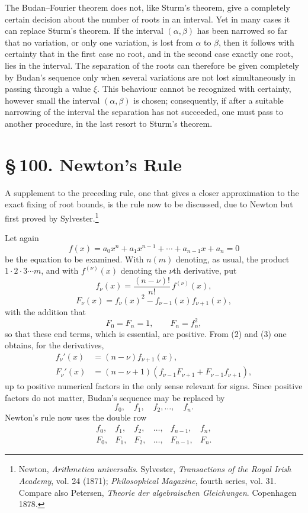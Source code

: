 \documentclass[11pt]{article}
\providecommand{\sect}[2]{\section*{\S\,#1. #2}}
\begin{document}
The Budan--Fourier theorem does not, like Sturm's theorem, give a completely certain decision about the number of roots in an interval. Yet in many cases it can replace Sturm's theorem. If the interval $(\alpha,\beta)$ has been narrowed so far that no variation, or only one variation, is lost from $\alpha$ to $\beta$, then it follows with certainty that in the first case no root, and in the second case exactly one root, lies in the interval. The separation of the roots can therefore be given completely by Budan's sequence only when several variations are not lost simultaneously in passing through a value $\xi$. This behaviour cannot be recognized with certainty, however small the interval $(\alpha,\beta)$ is chosen; consequently, if after a suitable narrowing of the interval the separation has not succeeded, one must pass to another procedure, in the last resort to Sturm's theorem.

\sect{100}{Newton's Rule}

A supplement to the preceding rule, one that gives a closer approximation to the exact fixing of root bounds, is the rule now to be discussed, due to Newton but first proved by Sylvester.\footnote{Newton, \emph{Arithmetica universalis}. Sylvester, \emph{Transactions of the Royal Irish Academy}, vol. 24 (1871); \emph{Philosophical Magazine}, fourth series, vol. 31. Compare also Petersen, \emph{Theorie der algebraischen Gleichungen}. Copenhagen 1878.}

Let again
\begin{equation}
        f(x)=a_0x^n+a_1x^{n-1}+\cdots+a_{n-1}x+a_n=0
\tag{1}
\end{equation}
be the equation to be examined. With $n(m)$ denoting, as usual, the product $1\cdot2\cdot3\cdots m$, and with $f^{(\nu)}(x)$ denoting the $\nu$th derivative, put
\begin{equation}
        f_\nu(x)=\frac{(n-\nu)!}{n!}\,f^{(\nu)}(x),
\tag{2}
\end{equation}
\begin{equation}
        F_\nu(x)=f_\nu(x)^2-f_{\nu-1}(x)f_{\nu+1}(x),
\tag{3}
\end{equation}
with the addition that
\begin{equation}
        F_0=F_n=1,\qquad F_n=f_n^2,
\tag{4}
\end{equation}
so that these end terms, which is essential, are positive. From (2) and (3) one obtains, for the derivatives,
\begin{align}
        f_\nu'(x)&=(n-\nu)f_{\nu+1}(x),\tag{5}\\
        F_\nu'(x)&=(n-\nu+1)(f_{\nu-1}F_{\nu+1}+F_{\nu-1}f_{\nu+1}),
\tag{6}
\end{align}
up to positive numerical factors in the only sense relevant for signs. Since positive factors do not matter, Budan's sequence may be replaced by
\[
        f_0,\quad f_1,\quad f_2,\ldots,\quad f_n.
\]
Newton's rule now uses the double row
\begin{equation}
\begin{array}{cccccc}
f_0,&f_1,&f_2,&\ldots,&f_{n-1},&f_n,\\
F_0,&F_1,&F_2,&\ldots,&F_{n-1},&F_n.
\end{array}
\tag{7}
\end{equation}
\end{document}
